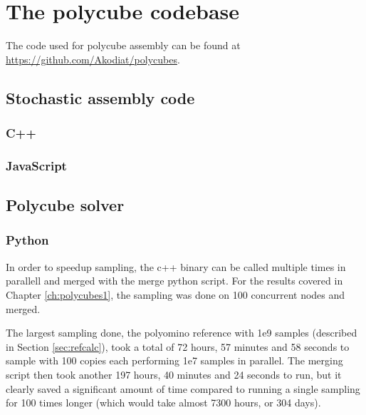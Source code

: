 

\chapter{The polycube codebase}
\label{ch:appendix_polycubes}

\minitoc

The code used for polycube assembly can be found at \url{https://github.com/Akodiat/polycubes}.

\section{Stochastic assembly code}

\subsection{C++}

\subsection{JavaScript}

\section{Polycube solver}

\subsection{Python}
In order to speedup sampling, the c++ binary can be called multiple times in parallell and merged with the merge python script. For the results covered in Chapter \ref{ch:polycubes1}, the sampling was done on 100 concurrent nodes and merged.

The largest sampling done, the polyomino reference with 1e9 samples (described in Section \ref{sec:refcalc}), took a total of 72 hours, 57 minutes and 58 seconds to sample with 100 copies each performing 1e7 samples in parallel. The merging script then took another 197 hours, 40 minutes and 24 seconds to run, but it clearly saved a significant amount of time compared to running a single sampling for 100 times longer (which would take almost 7300 hours, or 304 days).

